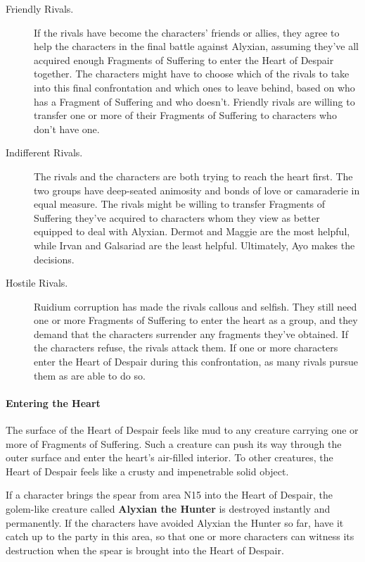 \documentclass[a4paper, 11pt, bg=full, twocolumn, nooutline]{dndbook}
\begin{document}
\begin{description}
\item[Friendly Rivals.] If the rivals have become the characters' friends or allies, they agree to help the characters in the final battle against Alyxian, assuming they've all acquired enough Fragments of Suffering to enter the Heart of Despair together. The characters might have to choose which of the rivals to take into this final confrontation and which ones to leave behind, based on who has a Fragment of Suffering and who doesn't. Friendly rivals are willing to transfer one or more of their Fragments of Suffering to characters who don't have one.
\item[Indifferent Rivals.] The rivals and the characters are both trying to reach the heart first. The two groups have deep-seated animosity and bonds of love or camaraderie in equal measure. The rivals might be willing to transfer Fragments of Suffering they've acquired to characters whom they view as better equipped to deal with Alyxian. Dermot and Maggie are the most helpful, while Irvan and Galsariad are the least helpful. Ultimately, Ayo makes the decisions.
\item[Hostile Rivals.] Ruidium corruption has made the rivals callous and selfish. They still need one or more Fragments of Suffering to enter the heart as a group, and they demand that the characters surrender any fragments they've obtained. If the characters refuse, the rivals attack them. If one or more characters enter the Heart of Despair during this confrontation, as many rivals pursue them as are able to do so.
\end{description}

\paragraph{Entering the Heart}

The surface of the Heart of Despair feels like mud to any creature carrying one or more of Fragments of Suffering. Such a creature can push its way through the outer surface and enter the heart's air-filled interior. To other creatures, the Heart of Despair feels like a crusty and impenetrable solid object.

If a character brings the spear from area N15 into the Heart of Despair, the golem-like creature called \textbf{Alyxian the Hunter} is destroyed instantly and permanently. If the characters have avoided Alyxian the Hunter so far, have it catch up to the party in this area, so that one or more characters can witness its destruction when the spear is brought into the Heart of Despair.
\end{document}
